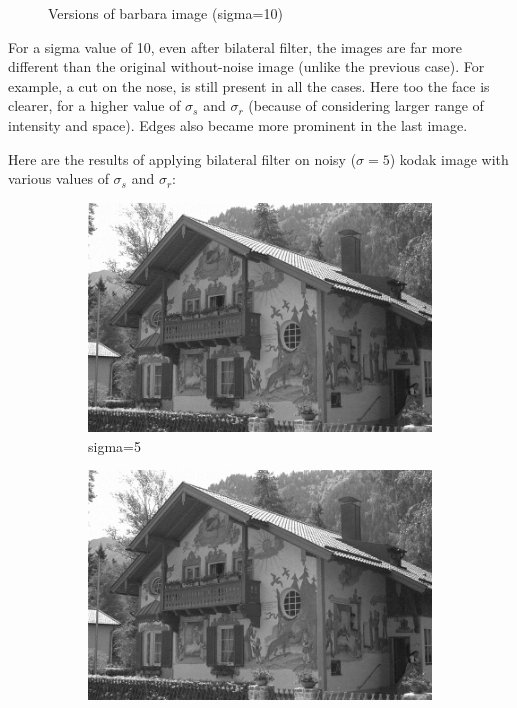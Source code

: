 \documentclass[12pt]{article}
\begin{document}
\begin{figure}[h]
    \caption{Versions of barbara image (sigma=10)}
    \label{fig:overall}
\end{figure}


For a sigma value of 10, even after bilateral filter, the images are far more different than the original without-noise image (unlike the previous case). For example, a cut on the nose, is still present in all the cases. Here too the face is clearer, for a higher value of $\sigma_s$ and $\sigma_r$ (because of considering larger range of intensity and space). Edges also became more prominent in the last image.


Here are the results of applying bilateral filter on noisy ($\sigma = 5$) kodak image with various values of $\sigma_s$ and $\sigma_r$:

\begin{figure}[h]
    \centering
    \begin{subfigure}[b]{0.24\textwidth}
        \centering
        \includegraphics[width=\textwidth]{../images/noisy_kodak_5.png}
        \caption{sigma=5}
        \label{Noisy (sigma=5)}
    \end{subfigure}
    \begin{subfigure}[b]{0.24\textwidth}
        \centering
        \includegraphics[width=\textwidth]{../images/filtered_kodak_5_sigma_s_2_sigma_r_2.png}

\end{subfigure}
\end{figure}
\end{document}
